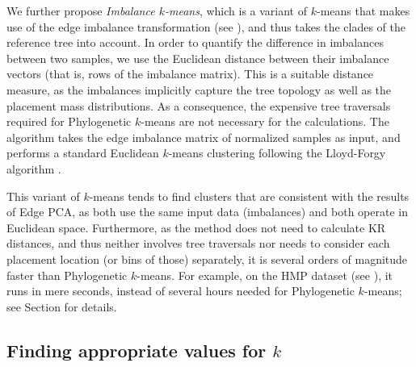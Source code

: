 We further propose \emph{Imbalance $k$-means},
which is a variant of $k$-means that makes use of the edge imbalance transformation
(see ),
and thus takes the clades of the reference tree into account.
In order to quantify the difference in imbalances between two samples,
we use the Euclidean distance between their imbalance vectors (that is, rows of the imbalance matrix).
This is a suitable distance measure,
as the imbalances implicitly capture the tree topology as well as the placement mass distributions.
As a consequence, the expensive tree traversals required for Phylogenetic $k$-means are not necessary for the calculations.
The algorithm takes the edge imbalance matrix of normalized samples as input,
and performs a standard Euclidean $k$-means clustering following the Lloyd-Forgy algorithm \cite{Lloyd1982,Forgy1965}.

This variant of $k$-means tends to find clusters that are consistent with the results of Edge PCA,
as both use the same input data (imbalances) and both operate in Euclidean space. %
Furthermore, as the method does not need to calculate KR distances,
and thus neither involves tree traversals nor needs to consider each placement location (or bins of those) separately,
it is several orders of magnitude faster than Phylogenetic $k$-means.
For example, on the \ac{HMP} dataset (see ),
it runs in mere seconds, instead of several hours needed for Phylogenetic $k$-means;
see Section  for details.


\subsection{Finding appropriate values for \texorpdfstring{$k$}{k}}
\label{ch:Clustering:sec:Methods:sub:FindingK}

